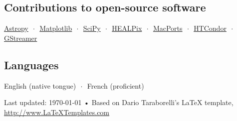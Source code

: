 \documentclass[10pt, letterpaper]{article} %
\newcommand{\listsep}{$\,\cdot\,$}
\begin{document}
\subsection*{Contributions to open-source software}

\href{http://www.astropy.org}{Astropy} \listsep{} \href{http://matplotlib.org}{Matplotlib} \listsep{} \href{http://www.scipy.org}{SciPy} \listsep{} \href{http://healpix.jpl.nasa.gov}{HEALPix} \listsep{} \href{http://www.macports.org/}{MacPorts} \listsep{} \href{http://research.cs.wisc.edu/htcondor/}{HTCondor} \listsep{} \href{http://gstreamer.net}{GStreamer}

\subsection*{Languages}

English (native tongue) \listsep{} French (proficient)

\vfill{} %


\begin{center}
{\scriptsize Last updated: \today\- •\- Based on Dario Taraborelli's LaTeX template, \href{http://www.LaTeXTemplates.com}{http://www.LaTeXTemplates.com}} %
\end{center}

\end{document}
